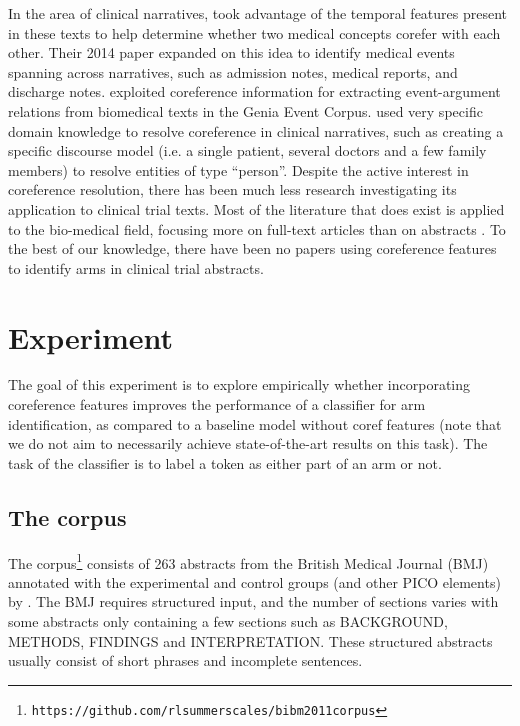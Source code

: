 In the area of clinical narratives,  took advantage of the temporal features present in these texts to help determine whether two medical concepts corefer with each other. Their 2014 paper \cite{Raghavan:2014} expanded on this idea to identify medical events spanning across narratives, such as admission notes, medical reports, and discharge notes.  exploited coreference information for extracting event-argument relations from biomedical texts in the Genia Event Corpus.  used very specific domain knowledge to resolve coreference in clinical narratives, such as creating a specific discourse model (i.e. a single patient, several doctors and a few family members) to resolve entities of type ``person''.  Despite the active interest in coreference resolution, there has been much less research investigating its application to clinical trial texts. Most of the literature that does exist is applied to the bio-medical field, focusing more on full-text articles \cite{Gasperin:2008,Huang:2010,Kilicoglu:2016} than on abstracts \cite{Castano:2002,Yang:2004}. To the best of our knowledge, there have been no papers using coreference features to identify arms in clinical trial abstracts. 

\section{Experiment}

The goal of this experiment is to explore empirically whether incorporating coreference features improves the performance of a classifier for arm identification, as compared to a baseline model without coref features (note that we do not aim to necessarily achieve state-of-the-art results on this task). The task of the classifier is to label a token as either part of an arm or not.

\subsection{The corpus}

The corpus\footnote{\scriptsize {\tt https://github.com/rlsummerscales/bibm2011corpus}} consists of 263 abstracts from the British Medical Journal (BMJ) annotated with the experimental and control groups (and other PICO elements) by . The BMJ requires structured input, and the number of sections varies with some abstracts only containing a few sections such as BACKGROUND, METHODS, FINDINGS and INTERPRETATION. These structured abstracts usually consist of short phrases and incomplete sentences. 

